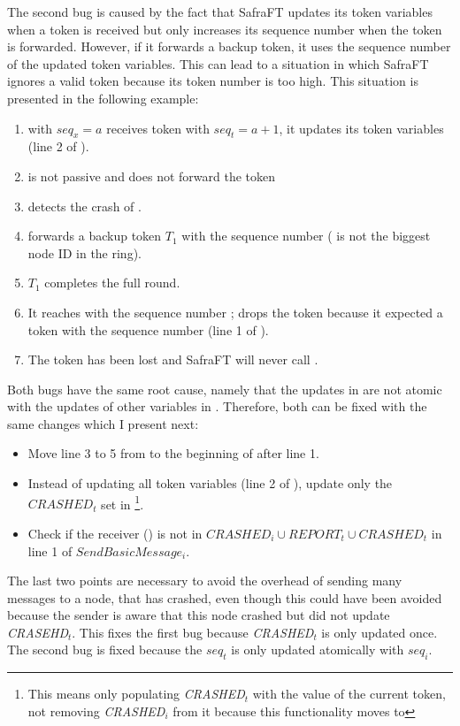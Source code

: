 The second bug is caused by the fact that SafraFT updates its token variables when a token is received but only increases its sequence number when the token is forwarded.
However, if it forwards a backup token, it uses the sequence number of the updated token variables.
This can lead to a situation in which SafraFT ignores a valid token because its token number is too high. This situation is presented in the following example:

\begin{enumerate}
	\item {} with $seq_x = a$ receives token  with $seq_t=a+1$, it updates its token variables (line 2 of ).
	\item {} is not passive and does not forward the token
	\item {} detects the crash of .
	\item {} forwards a backup token $T_1$ with the sequence number  ( is not the biggest node ID in the ring).
	\item $T_1$ completes the full round.
	\item It reaches  with the sequence number ;  drops the token because it expected a token with the sequence number  (line 1 of ).
	\item The token has been lost and SafraFT will never call .
\end{enumerate}

Both bugs have the same root cause, namely that the updates in  are not atomic with the updates of other variables in .
Therefore, both can be fixed with the same changes which I present next:
\begin{itemize}
	\item Move line 3 to 5 from  to the beginning of  after line 1.
	\item Instead of updating all token variables (line 2 of ), update only the $CRASHED_t$ set in \footnote{This means only populating \textit{CRASHED}$_t$ with the value of the current token, not removing \textit{CRASHED}$_i$ from it because this functionality moves to }.
	\item Check if the receiver () is not in $CRASHED_i \cup REPORT_t \cup CRASHED_t$ in line 1 of $SendBasicMessage_i$.
\end{itemize}

The last two points are necessary to avoid the overhead of sending many messages to a node, that has crashed, even though this could have been avoided because the sender is aware that this node crashed but did not update \textit{CRASEHD}$_t$.
This fixes the first bug because \textit{CRASHED}$_t$ is only updated once.
The second bug is fixed because the $seq_t$ is only updated atomically with $seq_i$.